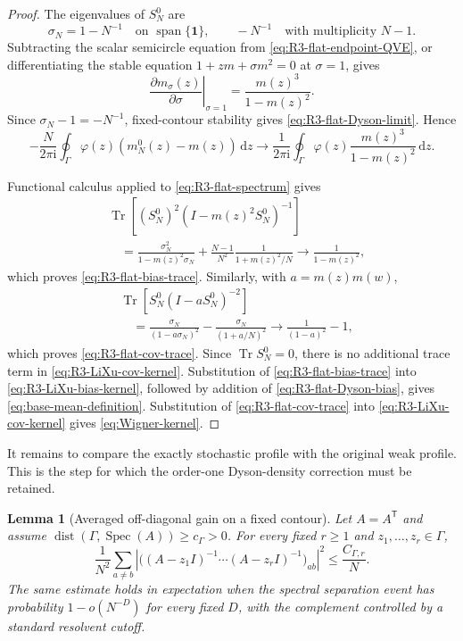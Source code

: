 \documentclass[10pt,a4paper]{amsart}
\newtheorem{lemma}[theorem]{Lemma}
\newcommand{\Tr}{\operatorname{Tr}}
\newcommand{\spec}{\operatorname{Spec}}
\newcommand{\ii}{\mathrm i}
\newcommand{\dd}{\mathrm d}
\newcommand{\one}{\mathbf 1}
\begin{document}
\begin{proof}
The eigenvalues of \(S_N^0\) are
\begin{equation}\label{eq:R3-flat-spectrum}
 \sigma_N=1-N^{-1}
 \quad\text{on }\operatorname{span}\{\one\},
 \qquad
 -N^{-1}
 \quad\text{with multiplicity }N-1.
\end{equation}
Subtracting the scalar semicircle equation from
\eqref{eq:R3-flat-endpoint-QVE}, or differentiating the stable equation
\(1+zm+\sigma m^2=0\) at \(\sigma=1\), gives
\[
 \left.\frac{\partial m_\sigma(z)}{\partial\sigma}\right|_{\sigma=1}
 =\frac{m(z)^3}{1-m(z)^2}.
\]
Since \(\sigma_N-1=-N^{-1}\), fixed-contour stability gives
\eqref{eq:R3-flat-Dyson-limit}.  Hence
\begin{equation}\label{eq:R3-flat-Dyson-bias}
 -\frac{N}{2\pi\ii}\oint_\Gamma
 \varphi(z)(m_N^0(z)-m(z))\,\dd z
 \longrightarrow
 \frac{1}{2\pi\ii}\oint_\Gamma
 \varphi(z)\frac{m(z)^3}{1-m(z)^2}\,\dd z.
\end{equation}

Functional calculus applied to \eqref{eq:R3-flat-spectrum} gives
\begin{align*}
 &\Tr\!\left[(S_N^0)^2(I-m(z)^2S_N^0)^{-1}\right]\\
 &\quad=
 \frac{\sigma_N^2}{1-m(z)^2\sigma_N}
 +\frac{N-1}{N^2}\frac{1}{1+m(z)^2/N}
 \longrightarrow\frac{1}{1-m(z)^2},
\end{align*}
which proves \eqref{eq:R3-flat-bias-trace}.  Similarly, with
\(a=m(z)m(w)\),
\begin{align*}
 &\Tr\!\left[S_N^0(I-aS_N^0)^{-2}\right]\\
 &\quad=
 \frac{\sigma_N}{(1-a\sigma_N)^2}
 -\frac{\sigma_N}{(1+a/N)^2}
 \longrightarrow\frac{1}{(1-a)^2}-1,
\end{align*}
which proves \eqref{eq:R3-flat-cov-trace}.  Since \(\Tr S_N^0=0\), there is
no additional trace term in \eqref{eq:R3-LiXu-cov-kernel}.  Substitution of
\eqref{eq:R3-flat-bias-trace} into \eqref{eq:R3-LiXu-bias-kernel}, followed by
addition of \eqref{eq:R3-flat-Dyson-bias}, gives
\eqref{eq:base-mean-definition}.  Substitution of
\eqref{eq:R3-flat-cov-trace} into \eqref{eq:R3-LiXu-cov-kernel} gives
\eqref{eq:Wigner-kernel}.
\end{proof}

It remains to compare the exactly stochastic profile with the original weak
profile.  This is the step for which the order-one Dyson-density correction
must be retained.

\begin{lemma}[Averaged off-diagonal gain on a fixed contour]
\label{lem:R3-averaged-offdiag}
Let \(A=A^{\mathsf T}\) and assume
\(\operatorname{dist}(\Gamma,\spec(A))\ge c_\Gamma>0\).  For every fixed
\(r\ge1\) and \(z_1,\ldots,z_r\in\Gamma\),
\begin{equation}\label{eq:R3-deterministic-offdiag}
 \frac1{N^2}\sum_{a\ne b}
 \left|
 \bigl((A-z_1I)^{-1}\cdots(A-z_rI)^{-1}\bigr)_{ab}
 \right|^2
 \le\frac{C_{\Gamma,r}}{N}.
\end{equation}
The same estimate holds in expectation when the spectral separation event has
probability \(1-o(N^{-D})\) for every fixed \(D\), with the complement
controlled by a standard resolvent cutoff.
\end{lemma}
\end{document}
